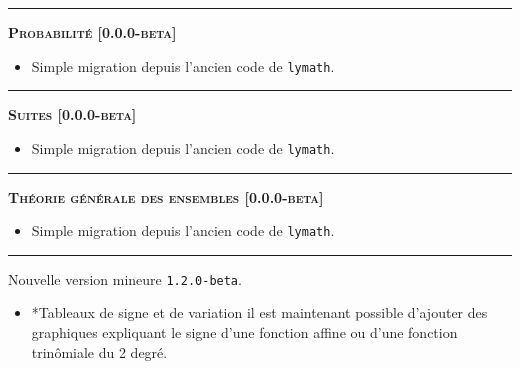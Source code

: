 \documentclass[12pt,a4paper]{book}
\makeatletter
\theoremstyle{definition}
\newcommand\separation{
	\medskip
	\hfill\rule{0.5\textwidth}{0.75pt}\hfill
	\medskip
}
\newcommand\topic{\@ifstar{\@topic@star}{\@topic@no@star}}
\newcommand\@topic@no@star[1]{%
	\textbf{\textsc{#1}.}%
}
\newcommand\@topic@star[1]{%
	\textbf{\textsc{#1} :}%
}
\makeatother
\begin{document}
{{\begin{description}
    
    \separation
    
    
    
    
    \begin{center}
        \textbf{\textsc{Probabilité [0.0.0-beta]}}
    \end{center}
    
    \begin{itemize}[itemsep=.5em]
        \item Simple migration depuis l'ancien code de \verb+lymath+.
    \end{itemize}
    
    
    \separation
    
    
    
    
    \begin{center}
        \textbf{\textsc{Suites [0.0.0-beta]}}
    \end{center}
    
    \begin{itemize}[itemsep=.5em]
        \item Simple migration depuis l'ancien code de \verb+lymath+.
    \end{itemize}
    
    
    \separation
    
    
    
    
    \begin{center}
        \textbf{\textsc{Théorie générale des ensembles [0.0.0-beta]}}
    \end{center}
    
    \begin{itemize}[itemsep=.5em]
        \item Simple migration depuis l'ancien code de \verb+lymath+.
    \end{itemize}
    
    
    \separation


    \medskip
    \item[2020-07-05] Nouvelle version mineure \verb+1.2.0-beta+.
    
    \begin{itemize}[itemsep=.5em]
        \item \topic*{Tableaux de signe et de variation}
              il est maintenant possible d'ajouter des graphiques expliquant le signe d'une fonction affine ou d'une fonction trinômiale du 2\ieme{} degré.
    \end{itemize}


\end{description}}}
\end{document}
